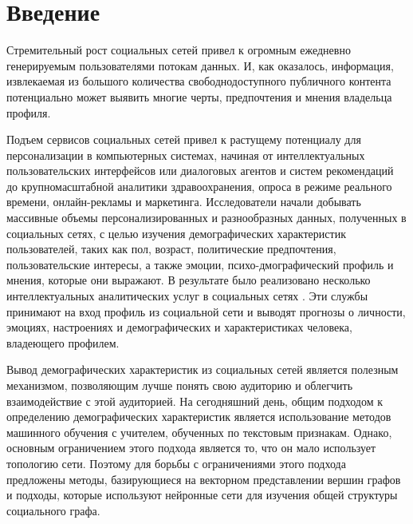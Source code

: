 \section{Введение}
Стремительный рост социальных сетей привел к огромным ежедневно генерируемым пользователями потокам данных. И, как оказалось, информация, извлекаемая из большого количества свободнодоступного публичного контента потенциально может выявить многие черты, предпочтения и мнения владельца профиля.

Подъем сервисов социальных сетей привел к растущему потенциалу
для персонализации в компьютерных системах, начиная от
интеллектуальных пользовательских интерфейсов или диалоговых агентов и
систем рекомендаций до крупномасштабной аналитики здравоохранения,
опроса в режиме реального времени, онлайн-рекламы и маркетинга.
Исследователи начали добывать массивные объемы персонализированных и
разнообразных данных, полученных в социальных сетях, с целью изучения
демографических характеристик пользователей, таких как пол, возраст,
политические предпочтения, пользовательские
интересы, а также эмоции, психо-дмографический профиль и мнения, которые они выражают. В результате
было реализовано несколько интеллектуальных аналитических услуг в
социальных сетях \cite{ApplyMagicSauce, PersonalityInsights}. Эти службы принимают на вход профиль из социальной
сети и выводят прогнозы о личности, эмоциях, настроениях и
демографических и характеристиках человека, владеющего профилем.

Вывод демографических характеристик из социальных сетей является полезным механизмом, позволяющим лучше понять свою аудиторию и облегчить взаимодействие с этой аудиторией.  На сегодняшний день, общим подходом к определению демографических характеристик является использование методов машинного обучения с учителем, обученных по текстовым признакам. Однако, основным ограничением этого подхода является то, что он мало использует топологию сети. Поэтому для борьбы с ограничениями этого подхода предложены методы, базирующиеся на векторном представлении вершин графов и подходы, которые используют нейронные сети для изучения общей структуры социального графа.

\clearpage